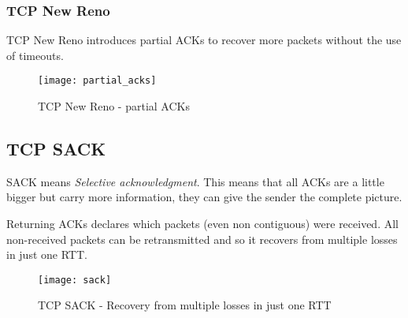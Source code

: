 \subsubsection{TCP New Reno}
TCP New Reno introduces partial ACKs to recover more packets without the use of
timeouts.
\begin{figure}[h]
  \texttt{[image: partial\_acks]}
  \caption[TCP New Reno]{TCP New Reno - partial ACKs}
\end{figure}

\subsection{TCP SACK}
SACK means \textit{Selective acknowledgment}. This means that all ACKs are a
little bigger but carry more information, they can give the sender the complete 
picture.

Returning ACKs declares which packets (even non contiguous) were received.
All non-received packets can be retransmitted and so it recovers from multiple
losses in just one RTT.
\begin{figure}[h]
  \texttt{[image: sack]}
  \caption[TCP SACK]{TCP SACK - Recovery from multiple losses in just one RTT}
\end{figure}
